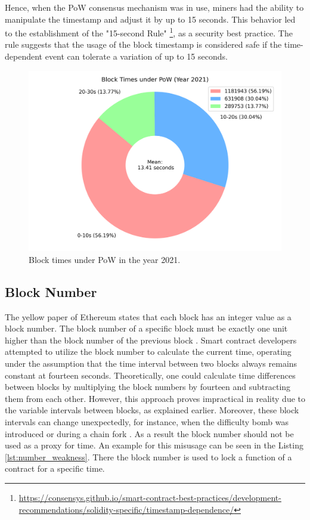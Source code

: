 Hence, when the PoW consensus mechanism was in use, miners had the ability to
manipulate the timestamp and adjust it by up to 15 seconds. This behavior led
to the establishment of the "15-second Rule"
\footnote{\url{https://consensys.github.io/smart-contract-best-practices/development-recommendations/solidity-specific/timestamp-dependence/}},
as a security best practice. The
rule suggests that the usage of the block timestamp is considered
safe if the time-dependent event can tolerate a variation of up to 15 seconds. 

\begin{figure}[H]
  \centering
  \includegraphics[width=1\textwidth]{block_time_analysis/pow_block_time_pie_chart.png}
  \caption{Block times under PoW in the year 2021.}
  \label{fig:block_time_analysis_pow}
\end{figure}

\subsection{Block Number}
The yellow paper of Ethereum states that each block has
an integer value as a block number. The block number
of a specific block must be exactly one unit higher than the block
number of the previous block \cite{ethyellowpaper2023}.
Smart contract developers attempted to utilize the block number to calculate
the current time, operating under the assumption that the time interval between
two blocks always remains constant at fourteen seconds. Theoretically, one could
calculate time differences between blocks by multiplying the block numbers by fourteen 
and subtracting them from each other.
However, this approach proves impractical in reality due to the variable
intervals between blocks, as explained earlier. Moreover, these block intervals
can change unexpectedly, for instance, when the difficulty bomb was introduced
or during a chain fork \cite{swc116}.
As a result the block number should not be used as a proxy for time.
An example for this misusage can be seen in the Listing \ref{lst:number_weakness}.
There the block number is used to lock a function of a contract for a specific time.

